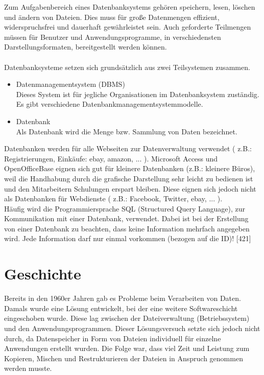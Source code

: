 \documentclass[12pt,a4paper]{report}
\begin{document}
\begin{onehalfspace}
Zum Aufgabenbereich eines Datenbanksystems gehören speichern, lesen, löschen und ändern von Dateien. Dies muss für große Datenmengen effizient, widerspruchsfrei und dauerhaft gewährleistet sein. Auch geforderte Teilmengen müssen für Benutzer und Anwendungsprogramme, in verschiedensten Darstellungsformaten, bereitgestellt werden können.\\
\\Datenbanksysteme setzen sich grundsätzlich aus zwei Teilsystemen zusammen.
\begin{itemize}
\item Datenmanagementsystem (DBMS)\\
Dieses System ist für jegliche Organisationen im Datenbanksystem zuständig. Es gibt verschiedene Datenbankmanagementsystemmodelle.
\item Datenbank\\
Als Datenbank wird die Menge bzw. Sammlung von Daten bezeichnet.
\end{itemize} 
Datenbanken werden für alle Webseiten zur Datenverwaltung verwendet ( z.B.: Registrierungen, Einkäufe: ebay, amazon, ... ).
Microsoft Access und OpenOfficeBase eignen sich gut für kleinere Datenbanken (z.B.: kleinere Büros), weil die Handhabung durch die grafische Darstellung sehr leicht zu bedienen ist und den Mitarbeitern Schulungen erspart bleiben.
Diese eignen sich jedoch nicht als Datenbanken für Webdienste ( z.B.: Facebook, Twitter, ebay, ... ).\\

Häufig wird die Programmiersprache SQL (Structured Query Language), zur Kommunikation mit einer Datenbank, verwendet. Dabei ist bei der Erstellung von einer Datenbank zu beachten, dass keine Information mehrfach angegeben wird. Jede Information darf nur einmal vorkommen (bezogen auf die ID)! [421]

\section{Geschichte}
Bereits in den 1960er Jahren gab es Probleme beim Verarbeiten von Daten. Damals wurde eine Lösung entwickelt, bei der eine weitere Softwareschicht eingeschoben wurde. Diese lag zwischen der Dateiverwaltung (Betriebssystem) und den Anwendungsprogrammen. Dieser Lösungsversuch setzte sich jedoch nicht durch, da Datenspeicher in Form von Dateien individuell für einzelne Anwendungen erstellt wurden. Die Folge war, dass viel Zeit und Leistung zum Kopieren, Mischen und Restrukturieren der Dateien in Anspruch genommen werden musste.\\


\end{onehalfspace}
\end{document}
